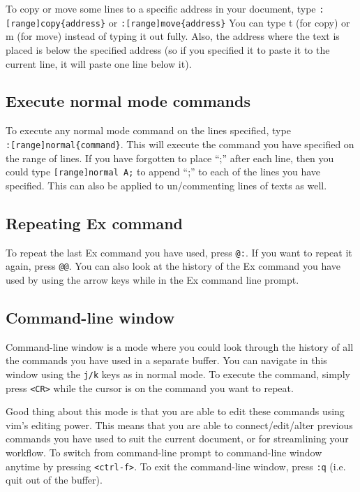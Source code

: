 To copy or move some lines to a specific address in your document, type \verb|:[range]copy{address}| or \verb|:[range]move{address}|
You can type t (for copy) or m (for move) instead of typing it out fully.
Also, the address where the text is placed is below the specified address (so if you specified it to paste it to the current line, it will paste one line below it).

\subsection{Execute normal mode commands}

To execute any normal mode command on the lines specified, type \\\verb|:[range]normal{command}|.
This will execute the command you have specified on the range of lines.
If you have forgotten to place ``;'' after each line, then you could type \verb|[range]normal A;| to append ``;'' to each of the lines you have specified.
This can also be applied to un/commenting lines of texts as well.

\subsection{Repeating Ex command}

To repeat the last Ex command you have used, press \verb|@:|.
If you want to repeat it again, press \verb|@@|.
You can also look at the history of the Ex command you have used by using the arrow keys while in the Ex command line prompt.

\subsection{Command-line window}

Command-line window is a mode where you could look through the history of all the commands you have used in a separate buffer.
You can navigate in this window using the \verb|j/k| keys as in normal mode.
To execute the command, simply press \verb|<CR>| while the cursor is on the command you want to repeat.

Good thing about this mode is that you are able to edit these commands using vim's editing power.
This means that you are able to connect/edit/alter previous commands you have used to suit the current document, or for streamlining your workflow.
To switch from command-line prompt to command-line window anytime by pressing \verb|<ctrl-f>|.
To exit the command-line window, press \verb|:q| (i.e. quit out of the buffer).

